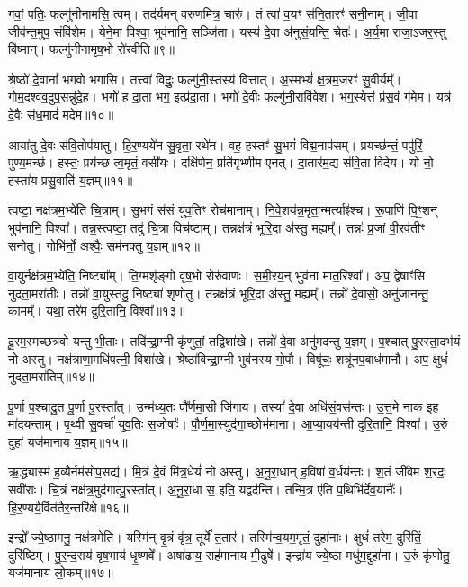 गवां॒ पतिः॒ फल्गु॑नीनामसि॒ त्वम्। तद॑र्यमन् वरुणमित्र॒ चारु॑। तं त्वा॑ व॒यꣳ स॑नि॒तारꣳ॑ सनी॒नाम्। जी॒वा जीव॑न्त॒मुप॒ संवि॑शेम। येने॒मा विश्वा॒ भुव॑नानि॒ सञ्जि॑ता। यस्य॑ दे॒वा अ॑नुसं॒यन्ति॒ चेतः॑। अ॒र्य॒मा राजा॒ऽजर॒स्तु वि॑ष्मान्। फल्गु॑नीनामृष॒भो रो॑रवीति॥९॥ 

श्रेष्ठो॑ दे॒वानां᳚ भगवो भगासि। तत्त्वा॑ विदुः॒ फल्गु॑नी॒स्तस्य॑ वित्तात्। अ॒स्मभ्यं॑ क्ष॒त्रम॒जरꣳ॑ सु॒वीर्यम्᳚। गोम॒दश्व॑व॒दुप॒सन्नु॑\-दे॒ह। भगो॑ ह दा॒ता भग॒ इत्प्र॑दा॒ता। भगो॑ दे॒वीः फल्गु॑नी॒रावि॑वेश। भग॒स्येत्तं प्र॑स॒वं ग॑मेम। यत्र॑ दे॒वैः स॑ध॒मादं॑ मदेम॥१०॥ 

आया॑तु दे॒वः स॑वि॒तोप॑यातु। हि॒र॒ण्यये॑न सु॒वृता॒ रथे॑न। वह॒\an{} हस्तꣳ॑ सु॒भगं॑ विद्म॒नाप॑सम्। प्रयच्छ॑न्तं॒ पपु॑रिं॒ पुण्य॒मच्छ॑। हस्तः॒ प्रय॑च्छ त्व॒मृतं॒ वसी॑यः। दक्षि॑णेन॒ प्रति॑गृभ्णीम एनत्। दा॒तार॑म॒द्य स॑वि॒ता वि॑देय। यो नो॒ हस्ता॑य प्रसु॒वाति॑ य॒ज्ञम्॥११॥ 

त्वष्टा॒ नक्ष॑त्रम॒भ्ये॑ति चि॒त्राम्। सु॒भगं स॑सं युव॒तिꣳ रोच॑मानाम्। नि॒वे॒शय॑न्न॒\-मृता॒न्मर्त्याꣴ॑श्च। रू॒पाणि॑ पि॒ꣳ॒शन् भुव॑नानि॒ विश्वा᳚। तन्न॒स्त्वष्टा॒ तदु॑ चि॒त्रा विच॑ष्टाम्। तन्नक्ष॑त्रं भूरि॒दा अ॑स्तु॒ मह्यम्᳚। तन्नः॑ प्र॒जां वी॒रव॑तीꣳ सनोतु। गोभि॑र्नो॒ अश्वैः॒ सम॑नक्तु य॒ज्ञम्॥१२॥ 

वा॒युर्नक्ष॑त्रम॒भ्ये॑ति॒ निष्ट्या᳚म्। ति॒ग्मशृ॑ङ्गो वृष॒भो रोरु॑वाणः। स॒मी॒रय॒न् भुव॑ना मात॒रिश्वा᳚। अप॒ द्वेषाꣳ॑सि नुदता॒मरा॑तीः। तन्नो॑ वा॒युस्तदु॒ निष्ट्या॑ शृणोतु। तन्नक्ष॑त्रं भूरि॒दा अ॑स्तु॒ मह्यम्᳚। तन्नो॑ दे॒वासो॒ अनु॑जानन्तु॒ कामम्᳚। यथा॒ तरे॑म दुरि॒तानि॒ विश्वा᳚॥१३॥ 

दू॒रम॒स्मच्छत्र॑वो यन्तु भी॒ताः। तदि॑न्द्रा॒ग्नी कृ॑णुतां॒ तद्विशा॑खे। तन्नो॑ दे॒वा अनु॑मदन्तु य॒ज्ञम्। प॒श्चात् पु॒रस्ता॒दभ॑यं नो अस्तु। नक्ष॑त्राणा॒मधि॑पत्नी॒ विशा॑खे। श्रेष्ठा॑विन्द्रा॒ग्नी भुव॑नस्य गो॒पौ। विषू॑चः॒ शत्रू॑नप॒बाध॑मानौ। अप॒ क्षुधं॑ नुदता॒मरा॑तिम्॥१४॥ 

पू॒र्णा प॒श्चादु॒त पू॒र्णा पु॒रस्ता᳚त्। उन्म॑ध्य॒तः पौ᳚र्णमा॒सी जि॑गाय। तस्यां᳚ दे॒वा अधि॑सं॒वस॑न्तः। उ॒त्त॒मे नाक॑ इ॒ह मा॑दयन्ताम्। पृ॒थ्वी सु॒वर्चा॑ युव॒तिः स॒जोषाः᳚। पौ॒र्ण॒मा॒स्युद॑गा॒च्छोभ॑माना। आ॒प्या॒यय॑न्ती दुरि॒तानि॒ विश्वा᳚। उ॒रुं दुहां॒ यज॑मानाय य॒ज्ञम्॥१५॥ 

ऋ॒द्ध्यास्म॑ ह॒व्यैर्नम॑सोप॒सद्य॑। मि॒त्रं दे॒वं मि॑त्र॒धेयं॑ नो अस्तु। अ॒नू॒रा॒धान् ह॒विषा॑ व॒र्धय॑न्तः। श॒तं जी॑वेम श॒रदः॒ सवी॑राः। चि॒त्रं नक्ष॑त्र॒मुद॑गात्पु॒रस्ता᳚त्। अ॒नू॒रा॒धा स॒ इति॒ यद्वद॑न्ति। तन्मि॒त्र ए॑ति प॒थिभि॑र्देव॒यानैः᳚। हि॒र॒ण्ययै॒र्वित॑तै\-र॒न्तरि॑क्षे॥१६॥ 

इन्द्रो᳚ ज्ये॒ष्ठामनु॒ नक्ष॑त्रमेति। यस्मि॑न् वृ॒त्रं वृ॑त्र॒ तूर्ये॑ त॒तार॑। तस्मि॑न्व॒यम॒मृतं॒ दुहा॑नाः। क्षुधं॑ तरेम॒ दुरि॑तिं॒ दुरि॑ष्टिम्। पु॒र॒न्द॒राय॑ वृष॒भाय॑ धृ॒ष्णवे᳚। अषा॑ढाय॒ सह॑मानाय मी॒ढुषे᳚। इन्द्रा॑य ज्ये॒ष्ठा मधु॑म॒द्दुहा॑ना। उ॒रुं कृ॑णोतु॒ यज॑मानाय लो॒कम्॥१७॥ 

